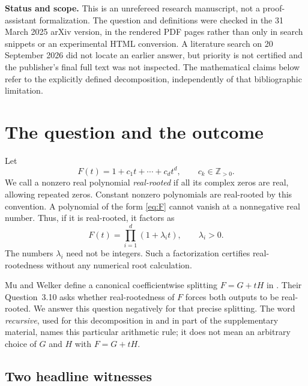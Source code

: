\documentclass[11pt,letterpaper]{article}
\numberwithin{equation}{section}
\theoremstyle{definition}
\theoremstyle{remark}
\newcommand{\ZZ}{\mathbb Z}
\begin{document}
\vfill
\noindent\textbf{Status and scope.}
This is an unrefereed research manuscript, not a proof-assistant
formalization. The question and definitions were checked in the
31 March 2025 arXiv version, in the rendered PDF pages rather than only in
search snippets or an experimental HTML conversion. A literature search on
20 September 2026 did not locate an earlier answer, but priority is not
certified and the publisher's final full text was not inspected. The
mathematical claims below refer to the explicitly defined decomposition,
independently of that bibliographic limitation.
\newpage
\tableofcontents
\newpage

\section{The question and the outcome}\label{sec:question}

Let
\begin{equation}\label{eq:F}
 F(t)=1+c_1t+\cdots+c_dt^d,\qquad c_k\in\ZZ_{>0}.
\end{equation}
We call a nonzero real polynomial \emph{real-rooted} if all its complex zeros
are real, allowing repeated zeros. Constant nonzero polynomials are
real-rooted by this convention. A polynomial of the form \eqref{eq:F} cannot
vanish at a nonnegative real number. Thus, if it is real-rooted, it factors
as
\begin{equation}\label{eq:positivefactor}
 F(t)=\prod_{i=1}^d(1+\lambda_i t),\qquad \lambda_i>0.
\end{equation}
The numbers $\lambda_i$ need not be integers. Such a factorization certifies
real-rootedness without any numerical root calculation.

Mu and Welker define a canonical coefficientwise splitting
$F=G+tH$ in \cite[Section~3.2]{MW}. Their Question~3.10 asks whether
real-rootedness of $F$ forces both outputs to be real-rooted. We answer this
question negatively for that precise splitting. The word \emph{recursive},
used for this decomposition in \cite{MW} and in part of the supplementary
material, names this particular arithmetic rule; it does not mean an
arbitrary choice of $G$ and $H$ with $F=G+tH$.

\subsection{Two headline witnesses}
\end{document}
